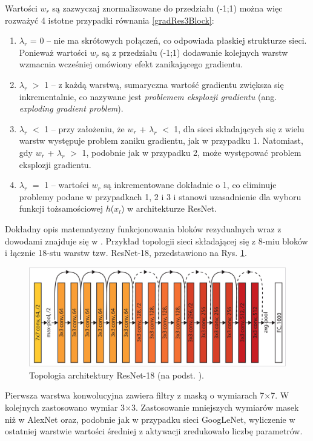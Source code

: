 Wartości $w_r$ są zazwyczaj znormalizowane do przedziału (-1;1) można więc rozważyć 4 istotne przypadki równania \ref{gradRes3Block}:
\begin{enumerate}
	\item $\lambda_r$ = 0 -- nie ma skrótowych połączeń, co odpowiada płaskiej strukturze sieci. Ponieważ wartości $w_r$ są z przedziału (-1;1) dodawanie kolejnych warstw wzmacnia wcześniej omówiony efekt zanikającego gradientu.
	\item $\lambda_r$ $>$ 1 -- z każdą warstwą, sumaryczna wartość gradientu zwiększa się inkrementalnie, co nazywane jest \textit{problemem eksplozji gradientu} (ang. \textit{exploding gradient problem}).
	\item $\lambda_r$ $<$ 1 -- przy założeniu, że $w_r$ + $\lambda_r$ $<$ 1, dla sieci składających się z wielu warstw występuje problem zaniku gradientu, jak w przypadku 1. Natomiast, gdy $w_r$ + $\lambda_r$ $>$ 1, podobnie jak w przypadku 2, może występować problem eksplozji gradientu.
	\item $\lambda_r$ $=$ 1 -- wartości $w_r$ są inkrementowane dokładnie o 1, co eliminuje problemy podane w przypadkach 1, 2 i 3 i stanowi uzasadnienie dla wyboru funkcji tożsamościowej $h$($x_l$) w architekturze ResNet.
\end{enumerate}
\newpage
Dokładny opis matematyczny funkcjonowania bloków rezydualnych wraz z dowodami znajduje się w \cite{DBLP:journals/corr/HeZR016}. Przykład topologii sieci składającej się z 8-miu bloków i łącznie 18-stu warstw tzw. ResNet-18, przedstawiono na Rys. \ref{ResNetTopo}.
\begin{figure}[h!]
	\centering
	\includegraphics[width=1\textwidth]{figures/ResNet.jpg}
	\caption{Topologia architektury ResNet-18 (na podst. \cite{ResNet}).}
	\label{ResNetTopo}
\end{figure} 

Pierwsza warstwa konwolucyjna zawiera filtry z maską o wymiarach 7$\times$7. \linebreak W kolejnych zastosowano wymiar 3$\times$3. Zastosowanie mniejszych wymiarów masek niż w AlexNet oraz, podobnie jak w przypadku sieci GoogLeNet, wyliczenie \linebreak w ostatniej warstwie wartości średniej z aktywacji zredukowało liczbę parametrów.

